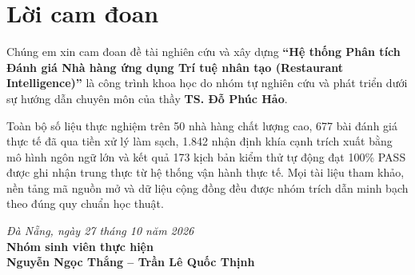 \chapter*{Lời cam đoan}

Chúng em xin cam đoan đề tài nghiên cứu và xây dựng \textbf{``Hệ thống Phân tích Đánh giá Nhà hàng ứng dụng Trí tuệ nhân tạo (Restaurant Intelligence)''} là công trình khoa học do nhóm tự nghiên cứu và phát triển dưới sự hướng dẫn chuyên môn của thầy \textbf{TS. Đỗ Phúc Hảo}.

Toàn bộ số liệu thực nghiệm trên 50 nhà hàng chất lượng cao, 677 bài đánh giá thực tế đã qua tiền xử lý làm sạch, 1.842 nhận định khía cạnh trích xuất bằng mô hình ngôn ngữ lớn và kết quả 173 kịch bản kiểm thử tự động đạt 100\% PASS được ghi nhận trung thực từ hệ thống vận hành thực tế. Mọi tài liệu tham khảo, nền tảng mã nguồn mở và dữ liệu cộng đồng đều được nhóm trích dẫn minh bạch theo đúng quy chuẩn học thuật.

\vspace{1.2cm}
\begin{flushright}
\textit{Đà Nẵng, ngày 27 tháng 10 năm 2026}\\
\textbf{Nhóm sinh viên thực hiện}\\[1.2cm]
\textbf{Nguyễn Ngọc Thắng -- Trần Lê Quốc Thịnh}
\end{flushright}
